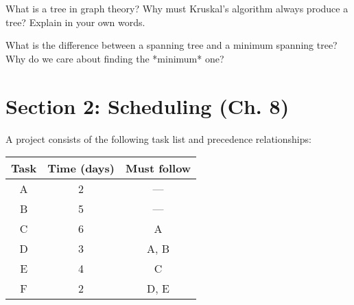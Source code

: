 \documentclass[12pt]{exam}
\begin{document}
\begin{questions}
\newpage
\question[4] What is a tree in graph theory? Why must Kruskal’s algorithm always produce a tree? Explain in your own words.

\vspace{9cm}

\question[4] What is the difference between a spanning tree and a minimum spanning tree? Why do we care about finding the *minimum* one?

\vfill

\newpage

\section*{Section 2: Scheduling (Ch. 8)}

\question[12] A project consists of the following task list and precedence relationships:

\begin{center}
\begin{tabular}{c|c|c}
\textbf{Task} & \textbf{Time (days)} & \textbf{Must follow} \\
\hline
A & 2 & --- \\
B & 5 & --- \\
C & 6 & A \\
D & 3 & A, B \\
E & 4 & C \\
F & 2 & D, E \\
\end{tabular}
\end{center}

\end{questions}
\end{document}
